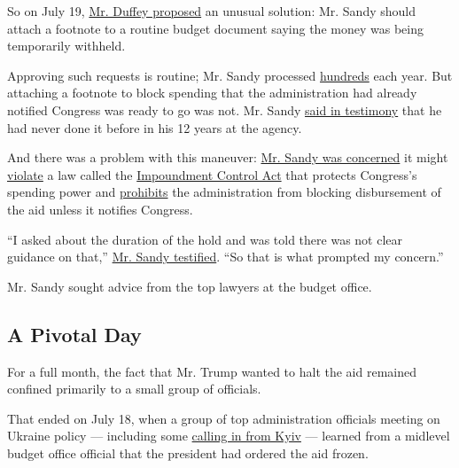 So on July 19,
\href{https://www.documentcloud.org/documents/6592845-2019-11-Mark-Sandy-Final-Redacted.html\#document/p33/a541448}{Mr.
Duffey proposed} an unusual solution: Mr. Sandy should attach a footnote
to a routine budget document saying the money was being temporarily
withheld.

Approving such requests is routine; Mr. Sandy processed
\href{https://www.documentcloud.org/documents/6592845-2019-11-Mark-Sandy-Final-Redacted.html\#document/p19/a541447}{hundreds}
each year. But attaching a footnote to block spending that the
administration had already notified Congress was ready to go was not.
Mr. Sandy
\href{https://www.documentcloud.org/documents/6592845-2019-11-Mark-Sandy-Final-Redacted.html\#document/p87/a541442}{said
in testimony} that he had never done it before in his 12 years at the
agency.

And there was a problem with this maneuver:
\href{https://www.documentcloud.org/documents/6592845-2019-11-Mark-Sandy-Final-Redacted.html\#document/p85/a541441}{Mr.
Sandy was concerned} it might
\href{https://www.documentcloud.org/documents/6592845-2019-11-Mark-Sandy-Final-Redacted.html\#document/p131/a541446}{violate}
a law called the
\href{https://history.house.gov/Historical-Highlights/1951-2000/Congressional-Budget-and-Impoundment-Control-Act-of-1974/}{Impoundment
Control Act} that protects Congress's spending power and
\href{https://www.gao.gov/products/B-330330}{prohibits} the
administration from blocking disbursement of the aid unless it notifies
Congress.

``I asked about the duration of the hold and was told there was not
clear guidance on that,''
\href{https://www.documentcloud.org/documents/6592845-2019-11-Mark-Sandy-Final-Redacted.html\#document/p35/a541518}{Mr.
Sandy testified}. ``So that is what prompted my concern.''

Mr. Sandy sought advice from the top lawyers at the budget office.

\hypertarget{a-pivotal-day}{%
\subsection{A Pivotal Day}\label{a-pivotal-day}}

For a full month, the fact that Mr. Trump wanted to halt the aid
remained confined primarily to a small group of officials.

That ended on July 18, when a group of top administration officials
meeting on Ukraine policy --- including some
\href{https://www.documentcloud.org/documents/6593140-2019-10-22-William-Taylor-Testimony.html\#document/p27/a541490}{calling
in from Kyiv} --- learned from a midlevel budget office official that
the president had ordered the aid frozen.

